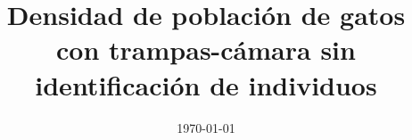 \documentclass{beamer}
\title[Estimaci\'on de la densidad de poblaci\'on]{Densidad de poblaci\'on de
gatos con trampas-c\'amara sin identificaci\'on de individuos \citep{Rowcliffe2008}}
\date{\today}
\institute{Direcci\'on de An\'alisis Cient\'ifico\\
	GECI}
\begin{document}
	\frame{\titlepage}

	
\end{document}
